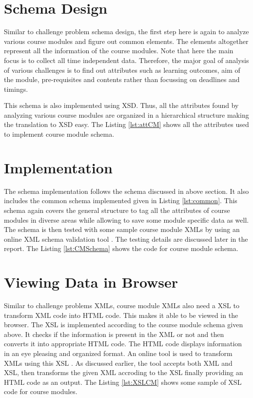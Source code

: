 \documentclass[11pt,letterpaper]{report}
\begin{document}
\section{Schema Design}
Similar to challenge problem schema design, the first step here is again to analyze various course modules and figure out common elements. The elements altogether represent all the information of the course modules. Note that here the main focus is to collect all time independent data. Therefore, the major goal of analysis of various challenges is to find out attributes such as learning outcomes, aim of the module, pre-requisites and contents rather than focussing on deadlines and timings.  

This schema is also implemented using XSD. Thus, all the attributes found by analyzing various course modules are organized in a hierarchical structure making the translation to XSD easy. The Listing \ref{lst:attCM} shows all the attributes used to implement course module schema.

 

\section{Implementation}
The schema implementation follows the schema discussed in above section. It also includes the common schema implemented given in Listing \ref{lst:common}. This schema again covers the general structure to tag all the attributes of course modules in diverse areas while allowing to save some module specific data as well. The schema is then tested with some sample course module XMLs by using an online XML schema validation tool \cite{olXSD}. The testing details are discussed later in the report.  The Listing \ref{lst:CMSchema} shows the code for course module schema.

 

\section{Viewing Data in Browser}
Similar to challenge problems XMLs, course module XMLs also need a XSL to transform XML code into HTML code. This makes it able to be viewed in the browser. The XSL is implemented according to the course module schema given above. It checks if the information is present in the XML or not and then converts it into appropriate HTML code. The HTML code displays information in an eye pleasing and organized format. An online tool is used to transform XMLs using this XSL \cite{olXSL}. As discussed earlier, the tool accepts both XML and XSL, then transforms the given XML accroding to the XSL finally providing an HTML code as an output. The Listing \ref{lst:XSLCM} shows some sample of XSL code for course modules. 
\end{document}
